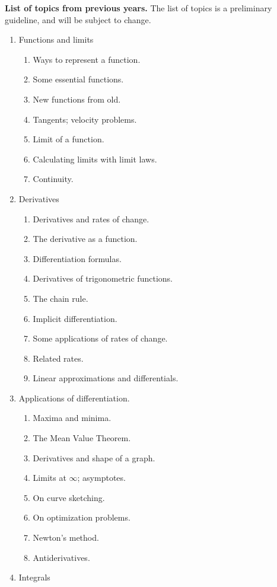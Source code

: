 \documentclass{article}
\begin{document}
\medskip
\noindent \textbf{List of topics from previous years.} The list of topics is a preliminary guideline, and will be subject to change.
\begin{enumerate}[label*=\arabic*.]
\item Functions and limits
\begin{enumerate}[label*=\arabic*.]
\item Ways to represent a function.
\item Some essential functions.
\item New functions from old.
\item Tangents; velocity problems.
\item Limit of a function.
\item Calculating limits with limit laws.
\item Continuity.
\end{enumerate}
\item Derivatives
\begin{enumerate}[label*=\arabic*.]
\item Derivatives and rates of change.
\item The derivative as a function.
\item Differentiation formulas.
\item Derivatives of trigonometric functions.
\item The chain rule.
\item Implicit differentiation.
\item Some applications of rates of change.
\item Related rates.
\item Linear approximations and differentials.
\end{enumerate}
\item Applications of differentiation.
\begin{enumerate}[label*=\arabic*.]
\item Maxima and minima.
\item The Mean Value Theorem.
\item Derivatives and shape of a graph.
\item Limits at $\infty$; asymptotes.
\item On curve sketching.
\item On optimization problems.
\item Newton's method.
\item Antiderivatives.
\end{enumerate}
\item Integrals

\end{enumerate}
\end{document}
